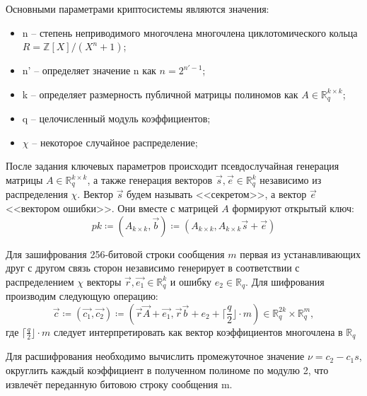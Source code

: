 Основными параметрами криптосистемы являются значения:
\begin{itemize}
    \item n -- степень неприводимого многочлена многочлена циклотомического кольца $R=\mathbb{Z}[X]/(X^{n}+1)$; 
    \item n' -- определяет значение n как $n=2^{n'-1}$;
    \item k -- определяет размерность публичной матрицы полиномов как $A\in\mathbb{R}_q^{k\times k}$;
    \item q -- целочисленный модуль коэффициентов;
    \item $\chi$ -- некоторое случайное распределение;
\end{itemize}
После задания ключевых параметров происходит псевдослучайная генерация матрицы $A\in\mathbb{R}_q^{k\times k}$, а также генерация векторов $\vec{s},\vec{e}\in\mathbb{R}_q^k$ независимо из распределения $\chi$. Вектор $\vec{s}$ будем называть <<секретом>>, а вектор $\vec{e}$ <<вектором ошибки>>. Они вместе с матрицей $A$ формируют открытый ключ:
\[
pk\coloneqq(A_{k \times k},\vec{b})\coloneqq(A_{k \times k},A_{k \times k} \vec{s} + \vec{e})
\]

Для зашифрования 256-битовой строки сообщения $m$ первая из устанавливающих друг с другом связь сторон независимо генерирует в соответствии с распределением $\chi$ векторы 
$\vec{r},\vec{e_1}\in\mathbb{R}_q^k$ и ошибку $e_2\in\mathbb{R}_q$. Для шифрования производим следующую операцию:
\[
\vec{c}\coloneqq(\vec{c_1}, \vec{c_2})\coloneqq(\vec{r} \vec{A} + \vec{e_1}, \vec{r} \vec{b} + e_2 + \biggl\lceil\frac{q}{2}\biggl\rfloor \cdot m) \in \mathbb{R}_q^{2k} \times \mathbb{R}_q^m,
\]
где $\bigl\lceil\frac{q}{2}\bigl\rfloor \cdot m$ следует интерпретировать как вектор коэффициентов многочлена в $\mathbb{R}_q$

Для расшифрования необходимо вычислить промежуточное значение $\nu=c_2-c_1s$, округлить каждый
коэффициент в полученном полиноме по модулю 2, что извлечёт переданную битовою строку сообщения m\cite{NIST_3-rd}.

